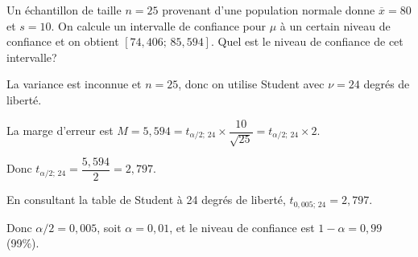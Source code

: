 \begin{questions}



\pageblanche

\question[7] Un échantillon de taille $n=25$ provenant d'une population normale donne $\overline{x}=80$ et $s=10$. On calcule un intervalle de confiance pour $\mu$ à un certain niveau de confiance et on obtient $[74{,}406;\, 85{,}594]$. Quel est le niveau de confiance de cet intervalle? 

\begin{solution}
La variance est inconnue et $n=25$, donc on utilise Student avec $\nu=24$ degrés de liberté.

La marge d'erreur est $M=5{,}594=t_{\alpha/2;\,24}\times\dfrac{10}{\sqrt{25}}=t_{\alpha/2;\,24}\times 2$.

Donc $t_{\alpha/2;\,24}=\dfrac{5{,}594}{2}= 2{,}797$.

En consultant la table de Student à 24 degrés de liberté, $t_{0{,}005;\,24}=2{,}797$.

Donc $\alpha/2=0{,}005$, soit $\alpha=0{,}01$, et le niveau de confiance est $1-\alpha=0{,}99$ (99\%).
\end{solution}

\end{questions}

